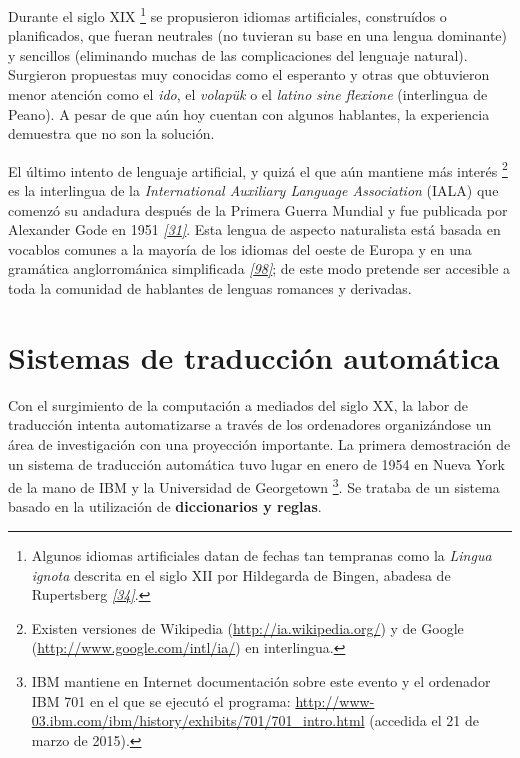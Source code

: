 \documentclass[a4paper,12pt,spanish]{book}
\begin{document}
Durante el siglo XIX \footnote{
Algunos idiomas artificiales datan de fechas tan tempranas como la \emph{Lingua ignota}
descrita en el siglo XII por Hildegarda de Bingen, abadesa de Rupertsberg \label{0.intro:id7}{\hyperref[zreferences:lang2008]{\emph{{[}34{]}}}}.
} se propusieron idiomas artificiales, construídos o planificados,
que fueran neutrales (no tuvieran su base en una lengua dominante) y sencillos (eliminando
muchas de las complicaciones del lenguaje natural). Surgieron propuestas muy conocidas
como el esperanto y otras que obtuvieron menor atención como el \emph{ido}, el
\emph{volapük} o el \emph{latino sine flexione} (interlingua de Peano). A pesar de que aún hoy
cuentan con algunos hablantes, la experiencia demuestra que no son la solución.

El último intento de lenguaje artificial, y quizá el que aún mantiene más interés \footnote{
Existen versiones de Wikipedia (\href{http://ia.wikipedia.org/}{http://ia.wikipedia.org/}) y de
Google (\href{http://www.google.com/intl/ia/}{http://www.google.com/intl/ia/}) en interlingua.
} es
la interlingua de la \emph{International Auxiliary Language Association} (IALA) que comenzó
su andadura después de la Primera Guerra Mundial y fue publicada por Alexander Gode
en 1951 \label{0.intro:id9}{\hyperref[zreferences:gode1955]{\emph{{[}31{]}}}}. Esta lengua de aspecto naturalista está basada en vocablos
comunes a la mayoría de los idiomas del oeste de Europa y en una gramática anglorrománica
simplificada \label{0.intro:id10}{\hyperref[zreferences:wp-interlingua]{\emph{{[}98{]}}}}; de este modo pretende ser accesible a toda la comunidad
de hablantes de lenguas romances y derivadas.


\section{Sistemas de traducción automática}
\label{0.intro:sistemas-de-traduccion-automatica}
Con el surgimiento de la computación a mediados del siglo XX, la labor de traducción
intenta automatizarse a través de los ordenadores organizándose un área de investigación
con una proyección importante. La primera demostración de un sistema de traducción
automática tuvo lugar en enero de 1954 en Nueva York de la mano de IBM y la Universidad
de Georgetown \footnote{
IBM mantiene en Internet documentación sobre este evento y el ordenador
IBM 701 en el que se ejecutó el programa: \href{http://www-03.ibm.com/ibm/history/exhibits/701/701\_intro.html}{http://www-03.ibm.com/ibm/history/exhibits/701/701\_intro.html} (accedida el 21 de marzo de 2015).
}. Se trataba de un sistema basado en la utilización de \textbf{diccionarios
y reglas}.
\end{document}

